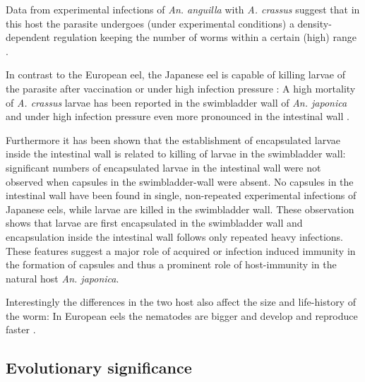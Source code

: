 Data from experimental infections of \textit{An. anguilla} with
\textit{A. crassus} suggest that in this host the parasite undergoes
(under experimental conditions) a density-dependent regulation keeping
the number of worms within a certain (high) range
\cite{fazio_regulation_2008}.

In contrast to the European eel, the Japanese eel is capable of
killing larvae of the parasite after vaccination
\cite{knopf_vaccination_2008} or under high infection pressure
\cite{heitlinger_massive_2009}: A high mortality of
\textit{A. crassus} larvae has been reported in the swimbladder wall
of \textit{An. japonica} \cite{mnderle_occurrence_2006} and under high
infection pressure even more pronounced in the intestinal wall
\cite{heitlinger_massive_2009}.

Furthermore it has been shown that the establishment of encapsulated
larvae inside the intestinal wall is related to killing of larvae in
the swimbladder wall: significant numbers of encapsulated larvae in
the intestinal wall were not observed when capsules in the
swimbladder-wall were absent. No capsules in the intestinal wall have
been found in single, non-repeated experimental infections of Japanese
eels, while larvae are killed in the swimbladder wall. These
observation shows that larvae are first encapsulated in the
swimbladder wall and encapsulation inside the intestinal wall follows
only repeated heavy infections. These features suggest a major role of
acquired or infection induced immunity in the formation of capsules
\cite{heitlinger_massive_2009} and thus a prominent role of
host-immunity in the natural host \textit{An. japonica}.

Interestingly the differences in the two host also affect the size and
life-history of the worm: In European eels the nematodes are bigger
and develop and reproduce faster \cite{knopf_differences_2004}.



\subsection{Evolutionary significance}
\label{ev-sig}

